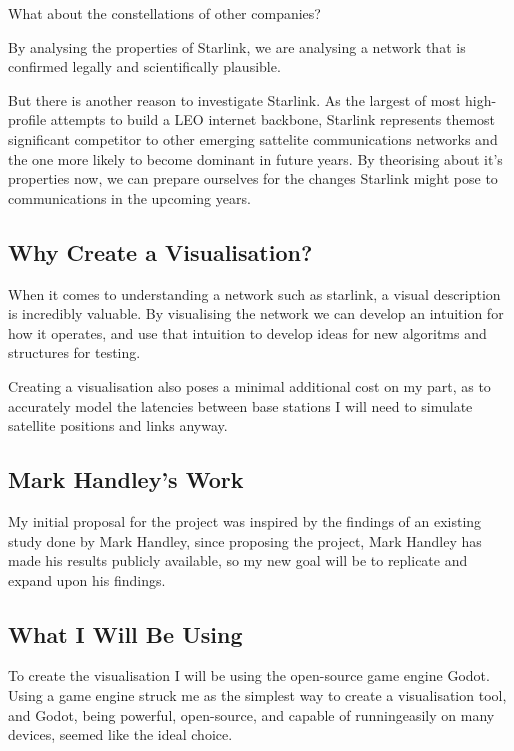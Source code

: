 \documentclass[12pt]{article}
\begin{document}
What about the constellations of other companies? %

By analysing the properties of Starlink, we are analysing a network that is confirmed legally and scientifically plausible.

But there is another reason to investigate Starlink. As the largest of most high-profile attempts to build a LEO internet backbone, Starlink represents themost significant competitor to other emerging sattelite communications networks and the one more likely to become dominant in future years. By theorising about it's properties now, we can prepare ourselves for the changes Starlink might pose to communications in the upcoming years.

\subsection{Why Create a Visualisation?}
When it comes to understanding a network such as starlink, a visual description is incredibly valuable. By visualising the network we can develop an intuition for how it operates, and use that intuition to develop ideas for new algoritms and structures for testing.

Creating a visualisation also poses a minimal additional cost on my part, as to accurately model the latencies between base stations I will need to simulate satellite positions and links anyway.

\subsection{Mark Handley's Work}


My initial proposal for the project was inspired by the findings of an existing study done  by Mark Handley, since proposing the project, Mark Handley has made his results publicly available\cite{OriginalReport}, so my new goal will be to replicate and expand upon his findings.

\subsection{What I Will Be Using}
To create the visualisation I will be using the open-source game engine Godot. Using a game engine struck me as the simplest way to create a visualisation tool, and Godot, being powerful, open-source, and capable of runningeasily on many devices, seemed like the ideal choice.
\end{document}
